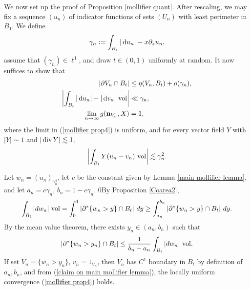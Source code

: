 We now set up the proof of Proposition \ref{mollifier quant}.
After rescaling, we may fix a sequence $(u_n)$ of indicator functions of sets $(U_n)$ with least perimeter in $B_1$.
We define
$$\gamma_n := \int_{B_1} |\mathop{}\!\mathrm{d} u_n| - x\partial_z u_n,$$
assume that $(\gamma_n) \in \ell^1$, and draw $t \in (0, 1)$ uniformly at random.
It now suffices to show that
\begin{align}
|\partial V_n \cap B_t| &\leq \eta(V_n, B_t) + o(\gamma_n), \label{mollifier prop1}\\
\left|\int_{B_t} |\mathop{}\!\mathrm{d} u_n| - |\mathop{}\!\mathrm{d} v_n| ~\mathrm{vol}\right| &\ll \gamma_n, \label{mollifier prop2}\\
\lim_{n \to \infty} g(\mathbf n_{V_n}, X) &= 1, \label{mollifier prop4}
\end{align}
where the limit in (\ref{mollifier prop4}) is uniform, and for every vector field $Y$ with $|Y| \sim 1$ and $|\operatorname{div} Y| \lesssim 1$,
\begin{equation}
\left|\int_{B_t} Y(u_n - v_n)~\mathrm{vol}\right| \lesssim \gamma_n^2. \label{mollifier prop3}
\end{equation}

Let $w_n = (u_n)_{\gamma_n^4}$, let $c$ be the constant given by Lemma \ref{main mollifier lemma}, and let $a_n = c\gamma_n$, $b_n = 1 - c\gamma_n$.
0By Proposition \ref{Coarea2},
$$\int_{B_t} |dw_n| ~\mathrm{vol} = \int_0^1 |\partial^* \{w_n > y\} \cap B_t| ~dy \geq \int_{a_n}^{b_n} |\partial^* \{w_n > y\} \cap B_t| ~dy.$$
By the mean value theorem, there exists $y_n \in (a_n, b_n)$ such that
\begin{equation}\label{MVT mollifier}
|\partial^* \{w_n > y_n\} \cap B_t| \leq \frac{1}{b_n - a_n} \int_{B_t} |dw_n| ~\mathrm{vol}.
\end{equation}
If set $V_n = \{w_n > y_n\}$, $v_n = 1_{V_n}$, then $V_n$ has $C^1$ boundary in $B_t$ by definition of $a_n, b_n$, and from (\ref{claim on main mollifier lemma}), the locally uniform convergence (\ref{mollifier prop4}) holds.

